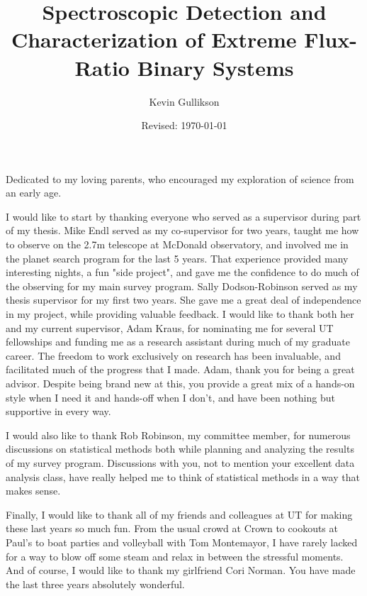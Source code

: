 \documentclass{utthesis}
\begin{document}
\author{Kevin Gullikson}
\title{Spectroscopic Detection and Characterization of Extreme Flux-Ratio Binary Systems}
\date{Revised: \today}

\UTcopyrightlegend %

\begin{UTcommittee}
\end{UTcommittee}


\frontmatter

\setcounter{page}{4}

\begin{UTdedication}
Dedicated to my loving parents, who encouraged my exploration of science from an early age.
\end{UTdedication}

\begin{UTacknowledgements}
I would like to start by thanking everyone who served as a supervisor during part of my thesis. Mike Endl served as my co-supervisor for two years, taught me how to observe on the 2.7m telescope at McDonald observatory, and involved me in the planet search program for the last 5 years. That experience provided many interesting nights, a fun "side project", and gave me the confidence to do much of the observing for my main survey program. Sally Dodson-Robinson served as my thesis supervisor for my first two years. She gave me a great deal of independence in my project, while providing valuable feedback. I would like to thank both her and my current supervisor, Adam Kraus, for nominating me for several UT fellowships and funding me as a research assistant during much of my graduate career. The freedom to work exclusively on research has been invaluable, and facilitated much of the progress that I made. Adam, thank you for being a great advisor. Despite being brand new at this, you provide a great mix of a hands-on style when I need it and hands-off when I don't, and have been nothing but supportive in every way. 

I would also like to thank Rob Robinson, my committee member, for numerous discussions on statistical methods both while planning and analyzing the results of my survey program. Discussions with you, not to mention your excellent data analysis class, have really helped me to think of statistical methods in a way that makes sense.

Finally, I would like to thank all of my friends and colleagues at UT for making these last years so much fun. From the usual crowd at Crown to cookouts at Paul's to boat parties and volleyball with Tom Montemayor, I have rarely lacked for a way to blow off some steam and relax in between the stressful moments. And of course, I would like to thank my girlfriend Cori Norman. You have made the last three years absolutely wonderful.

\end{UTacknowledgements}
\end{document}
